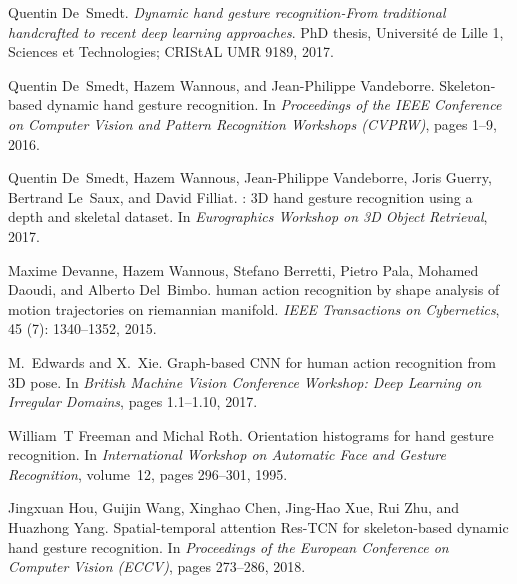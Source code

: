 \documentclass{bmvc2k}
\begin{document}
\begin{thebibliography}{42}
Quentin De~Smedt.
\newblock \emph{Dynamic hand gesture recognition-From traditional handcrafted
  to recent deep learning approaches}.
\newblock PhD thesis, Universit{\'e} de Lille 1, Sciences et Technologies;
  CRIStAL UMR 9189, 2017.

Quentin De~Smedt, Hazem Wannous, and Jean-Philippe Vandeborre.
\newblock Skeleton-based dynamic hand gesture recognition.
\newblock In \emph{Proceedings of the IEEE Conference on Computer Vision and
  Pattern Recognition Workshops (CVPRW)}, pages 1--9, 2016.

Quentin De~Smedt, Hazem Wannous, Jean-Philippe Vandeborre, Joris Guerry,
  Bertrand Le~Saux, and David Filliat.
: {3D} hand gesture recognition using a depth and
  skeletal dataset.
\newblock In \emph{Eurographics Workshop on 3D Object Retrieval}, 2017.

Maxime Devanne, Hazem Wannous, Stefano Berretti, Pietro Pala, Mohamed Daoudi,
  and Alberto Del~Bimbo.
 human action recognition by shape analysis of motion
  trajectories on riemannian manifold.
\newblock \emph{IEEE Transactions on Cybernetics}, 45 (7):
  1340--1352, 2015.

M.~Edwards and X.~Xie.
\newblock Graph-based {CNN} for human action recognition from {3D} pose.
\newblock In \emph{British Machine Vision Conference Workshop: Deep Learning on
  Irregular Domains}, pages 1.1--1.10, 2017.

William~T Freeman and Michal Roth.
\newblock Orientation histograms for hand gesture recognition.
\newblock In \emph{International Workshop on Automatic Face and Gesture
  Recognition}, volume~12, pages 296--301, 1995.

Jingxuan Hou, Guijin Wang, Xinghao Chen, Jing-Hao Xue, Rui Zhu, and Huazhong
  Yang.
\newblock Spatial-temporal attention {Res-TCN} for skeleton-based dynamic hand
  gesture recognition.
\newblock In \emph{Proceedings of the European Conference on Computer Vision
  (ECCV)}, pages 273--286, 2018.


\end{thebibliography}
\end{document}
